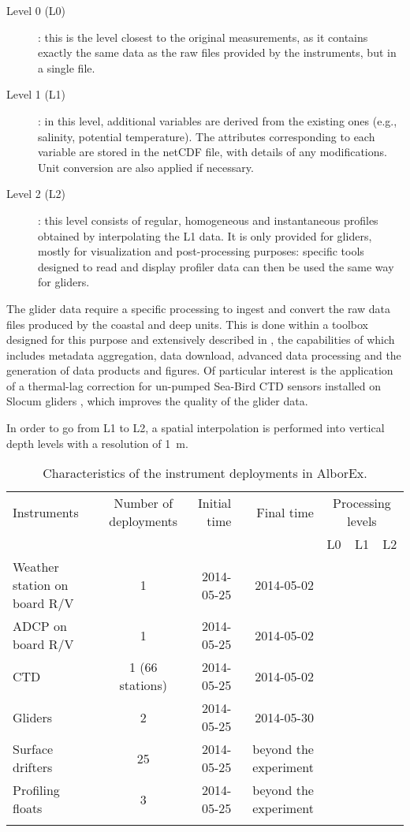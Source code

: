 \documentclass[essd,manuscript]{copernicus}
\begin{document}
\begin{description}
\item[Level 0 (L0)]: this is the level closest to the original measurements, as it contains exactly the same data as the raw files provided by the instruments, but in a single file.
\item[Level 1 (L1)]: in this level, additional variables are derived from the existing ones (e.g., salinity, potential temperature). The attributes corresponding to each variable are stored in the netCDF file, with details of any modifications. Unit conversion are also applied if necessary.
\item[Level 2 (L2)]: this level consists of regular, homogeneous and instantaneous profiles obtained by interpolating the L1 data. It is only provided for gliders, mostly for visualization and post-processing purposes: specific tools designed to read and display profiler data can then be used the same way for gliders.
\end{description}
The glider data require a specific processing to ingest and convert the raw data files produced by the coastal and deep units. This is done within a toolbox designed for this purpose and extensively described in \citet{TROUPIN16}, the capabilities of which includes metadata aggregation, data download, advanced data processing and the generation of data products and figures. Of particular interest is the application of a thermal-lag correction for un-pumped Sea-Bird CTD sensors installed on Slocum gliders \citep{GARAU11}, which improves the quality of the glider data.

In order to go from L1 to L2, a spatial interpolation is performed into vertical depth levels with a resolution of 1~m.

\begin{table*}[htpb]
\caption{Characteristics of the instrument deployments in AlborEx.\label{tab:deployment}}
\begin{tabular}{lcrrccc}
\tophline
Instruments 		& Number of deployments & Initial time	& Final time			& \multicolumn{3}{c}{Processing levels} \\
					& 						& 				& 						& L0 			& L1 		& L2 \\
\middlehline
Weather station on board R/V	& 1			& 2014-05-25	& 2014-05-02			& \checkmark	& \checkmark &  \\ 
ADCP on board R/V	& 1						& 2014-05-25	& 2014-05-02			& \checkmark	& \checkmark &  \\ 
CTD					& 1 (66 stations)		& 2014-05-25	& 2014-05-02			& \checkmark	& \checkmark &  \\ 
Gliders 			& 2						& 2014-05-25	& 2014-05-30 			& \checkmark 	& \checkmark & \checkmark \\
Surface drifters	& 25					& 2014-05-25	& beyond the experiment & \checkmark 	& \checkmark &  \\
Profiling floats	& 3						& 2014-05-25	& beyond the experiment & \checkmark 	& \checkmark &  \\
\bottomhline
\end{tabular}
\belowtable{} %
\end{table*}
\end{document}
